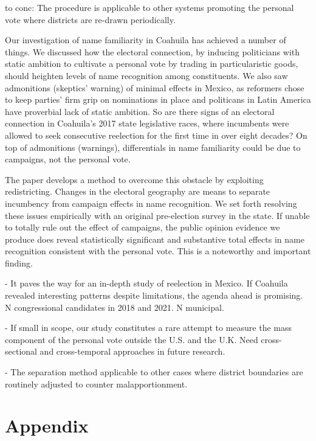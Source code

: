 \documentclass[letter,12pt]{article}
\begin{document}
to conc: The procedure is applicable to other systems promoting the personal vote \citep{carey.shugart.1995} where districts are re-drawn periodically.

Our investigation of name familiarity in Coahuila has achieved a number of things. We discussed how the electoral connection, by inducing politicians with static ambition to cultivate a personal vote by trading in particularistic goods, should heighten levels of name recognition among constituents. We also saw admonitions (skeptics' warning) of minimal effects in Mexico, as reformers chose to keep parties' firm grip on nominations in place and politicans in Latin America have proverbial lack of static ambition. So are there signs of an electoral connection in Coahuila's 2017 state legislative races, where incumbents were allowed to seek consecutive reelection for the first time in over eight decades? On top of admonitions (warnings), differentials in name familiarity could be due to campaigns, not the personal vote. 

The paper develops a method to overcome this obstacle by exploiting redistricting. Changes in the electoral geography are means to separate incumbency from campaign effects in name recognition. We set forth resolving these issues empirically with an original pre-election survey in the state. If unable to totally rule out the effect of campaigns, the public opinion evidence we produce does reveal statistically significant and substantive total effects in name recognition consistent with the personal vote. This is a noteworthy and important finding. 

- It paves the way for an in-depth study of reelection in Mexico. If Coahuila revealed interesting patterns despite limitations, the agenda ahead is promising. N congressional candidates in 2018 and 2021. N municipal.  

- If small in scope, our study constitutes a rare attempt to measure the mass component of the personal vote outside the U.S. and the U.K. 
Need cross-sectional and cross-temporal approaches in future research. 

- The separation method applicable to other cases where district boundaries are routinely adjusted to counter malapportionment.  




\newpage
\section{Appendix}
\end{document}
